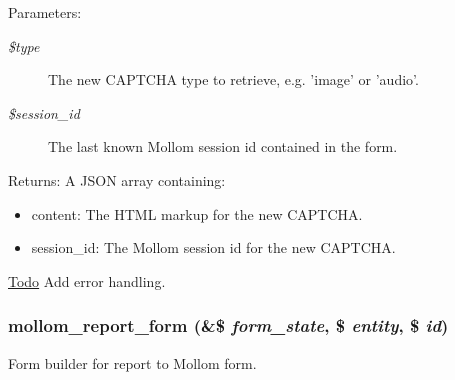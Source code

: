 \begin{Desc}
\item[Parameters:]
\begin{description}
\item[{\em \$type}]The new CAPTCHA type to retrieve, e.g. 'image' or 'audio'. \item[{\em \$session\_\-id}]The last known Mollom session id contained in the form.\end{description}
\end{Desc}
\begin{Desc}
\item[Returns:]A JSON array containing:\begin{itemize}
\item content: The HTML markup for the new CAPTCHA.\item session\_\-id: The Mollom session id for the new CAPTCHA.\end{itemize}
\end{Desc}
\begin{Desc}
\item[\hyperlink{todo__todo000006}{Todo}]Add error handling. \end{Desc}
\hypertarget{mollom_8pages_8inc_0aa683f81a3e5993abd967762344272a}{
\subsubsection[{mollom\_\-report\_\-form}]{\setlength{\rightskip}{0pt plus 5cm}mollom\_\-report\_\-form (\&\$ {\em form\_\-state}, \/  \$ {\em entity}, \/  \$ {\em id})}}
\label{mollom_8pages_8inc_0aa683f81a3e5993abd967762344272a}


Form builder for report to Mollom form.

